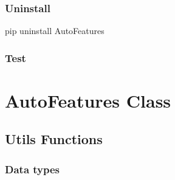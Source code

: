 \documentclass[letterpaper,11pt,english]{sphinxmanual}
\begin{document}
\subsection{Uninstall}
\label{\detokenize{install:uninstall}}
\begin{sphinxVerbatim}[commandchars=\\\{\}]
pip uninstall AutoFeatures
\end{sphinxVerbatim}


\subsection{Test}
\label{\detokenize{install:test}}

\chapter{AutoFeatures Class}
\label{\detokenize{auto_feature:autofeatures-class}}\label{\detokenize{auto_feature:form-frame}}\label{\detokenize{auto_feature::doc}}

\section{Utils Functions}
\label{\detokenize{auto_feature:utils-functions}}

\subsection{Data types}
\label{\detokenize{auto_feature:data-types}}
\end{document}
